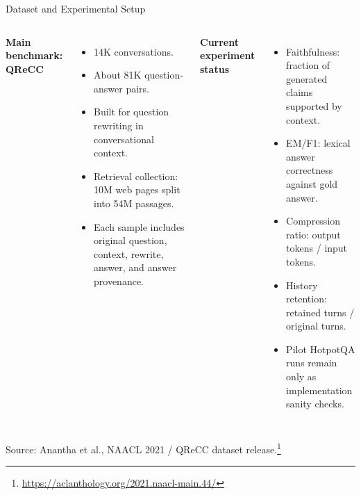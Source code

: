 \documentclass[aspectratio=169,11pt]{beamer}
\begin{document}
\begin{frame}{Dataset and Experimental Setup}
  \begin{columns}[T,onlytextwidth]
    \textbf{Main benchmark: QReCC}
    \begin{itemize}
      \item 14K conversations.
      \item About 81K question-answer pairs.
      \item Built for question rewriting in conversational context.
      \item Retrieval collection: 10M web pages split into 54M passages.
      \item Each sample includes original question, context, rewrite, answer, and answer provenance.
    \end{itemize}

    \textbf{Current experiment status}
    \begin{itemize}
      \item Faithfulness: fraction of generated claims supported by context.
      \item EM/F1: lexical answer correctness against gold answer.
      \item Compression ratio: output tokens / input tokens.
      \item History retention: retained turns / original turns.
      \item Pilot HotpotQA runs remain only as implementation sanity checks.
    \end{itemize}
  \end{columns}

  \vspace{0.5em}
  \footnotesize Source: Anantha et al., NAACL 2021 / QReCC dataset release.\footnote{\url{https://aclanthology.org/2021.naacl-main.44/}}
\end{frame}
\end{document}

